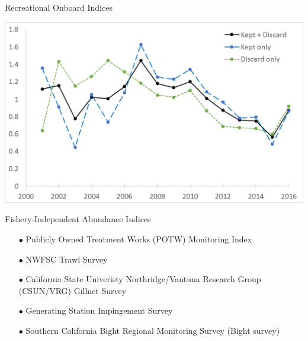 \documentclass[ignorenonframetext,]{beamer}
\begin{document}
\begin{frame}{Recreational Onboard Indices}

\includegraphics{Figures/Fleets6_12_index_compare.png}

\end{frame}

\begin{frame}{Fishery-Independent Abundance Indices}

\begin{itemize}
\item[$\bullet$] Publicly Owned Treatment Works (POTW) Monitoring Index
\item[$\bullet$] NWFSC Trawl Survey 
\item[$\bullet$] California State Univeristy Northridge/Vantuna Research Group (CSUN/VRG) Gillnet Survey
\item[$\bullet$] Generating Station Impingement Survey
\item[$\bullet$] Southern California Bight Regional Monitoring Survey (Bight survey)
\end{itemize}

\end{frame}
\end{document}
